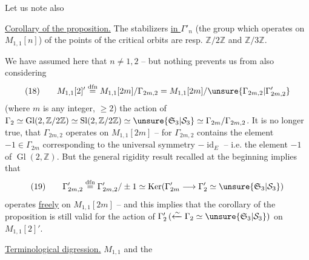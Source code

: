  Let us note  also

\uline{Corollary of the proposition.}  The stabilizers \uline{in $\Gamma'_n$} (the group which operates \uline{} on $M_{1,1}[n]$) of the points of the  critical orbits are resp. $\mathbb Z/2\mathbb Z$ and $\mathbb Z/3\mathbb Z$. 


We have assumed here that $n\ne1,2$ -- but nothing prevents us from also considering 
\[
(18)\qquad M_{1,1}[2]'\overset{\mathrm{dfn}}{=}M_{1,1}[2m]/\Gamma_{2m,2}
=M_{1,1}[2m]/\unsure{\Gamma_{2m,2}|\Gamma'_{2m,2}}
\]
(where $m$ is any integer, $\ge2$)
the action of $\Gamma_2\simeq\operatorname{Gl}(2,\mathbb Z/2\mathbb Z)\simeq\operatorname{Sl}(2,\mathbb Z/2\mathbb Z)\simeq\unsure{\mathfrak S_3|\mathcal S_3}\simeq\Gamma_{2m}/\Gamma_{2m,2}$.  It is no longer true,  that $\Gamma_{2m,2}$ operates  on $M_{1,1}[2m]$ -- for $\Gamma_{2m,2}$ contains the element $-1\in\Gamma_{2m}$ corresponding to the universal symmetry $-\operatorname{id}_E$ -- i.e.  the element  $-1$ of $\operatorname{Gl}(2,\mathbb Z)$. But the general rigidity result recalled at the beginning implies that 
\[
(19)\qquad\Gamma'_{2m,2}\overset{\mathrm{dfn}}{=}\Gamma_{2m,2}'/\pm1
\simeq\operatorname{Ker}(\Gamma'_{2m}\longrightarrow\Gamma'_2\simeq\unsure{\mathfrak S_3|\mathcal S_3})
\]
operates   \uline{freely} on $M_{1,1}[2m]$ -- and this implies that the corollary of the proposition is still valid for the action of $\Gamma'_2\,(\xleftarrow{\sim}\Gamma_2\simeq\unsure{\mathfrak S_3|\mathcal S_3})$ on $M_{1,1}[2]'$.

\uline{Terminological digression.} $M_{1,1}$  and the

